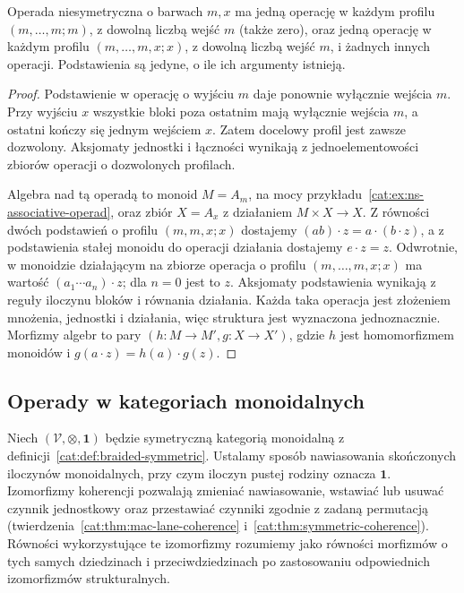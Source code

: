 \begin{przyklad}\label{cat:ex:colored-monoid-action}
Operada niesymetryczna o barwach $m,x$ ma jedną operację w każdym profilu $(m,\ldots,m;m)$, z dowolną liczbą wejść $m$ (także zero), oraz jedną operację w każdym profilu $(m,\ldots,m,x;x)$, z dowolną liczbą wejść $m$, i żadnych innych operacji. Podstawienia są jedyne, o ile ich argumenty istnieją.
\end{przyklad}
\begin{proof}
Podstawienie w operację o wyjściu $m$ daje ponownie wyłącznie wejścia $m$. Przy wyjściu $x$ wszystkie bloki poza ostatnim mają wyłącznie wejścia $m$, a ostatni kończy się jednym wejściem $x$. Zatem docelowy profil jest zawsze dozwolony. Aksjomaty jednostki i łączności wynikają z jednoelementowości zbiorów operacji o dozwolonych profilach.

Algebra nad tą operadą to monoid $M=A_m$, na mocy przykładu~\ref{cat:ex:ns-associative-operad}, oraz zbiór $X=A_x$ z działaniem $M\times X\to X$. Z równości dwóch podstawień o profilu $(m,m,x;x)$ dostajemy $(ab)\cdot z=a\cdot(b\cdot z)$, a z podstawienia stałej monoidu do operacji działania dostajemy $e\cdot z=z$. Odwrotnie, w monoidzie działającym na zbiorze operacja o profilu $(m,\ldots,m,x;x)$ ma wartość $(a_1\cdots a_n)\cdot z$; dla $n=0$ jest to $z$. Aksjomaty podstawienia wynikają z reguły iloczynu bloków i równania działania. Każda taka operacja jest złożeniem mnożenia, jednostki i działania, więc struktura jest wyznaczona jednoznacznie. Morfizmy algebr to pary $(h:M\to M',g:X\to X')$, gdzie $h$ jest homomorfizmem monoidów i $g(a\cdot z)=h(a)\cdot g(z)$.
\end{proof}

\subsection{Operady w kategoriach monoidalnych}

Niech $(\mathcal V,\otimes,\mathbf 1)$ będzie symetryczną kategorią monoidalną z definicji~\ref{cat:def:braided-symmetric}. Ustalamy sposób nawiasowania skończonych iloczynów monoidalnych, przy czym iloczyn pustej rodziny oznacza $\mathbf 1$. Izomorfizmy koherencji pozwalają zmieniać nawiasowanie, wstawiać lub usuwać czynnik jednostkowy oraz przestawiać czynniki zgodnie z zadaną permutacją (twierdzenia~\ref{cat:thm:mac-lane-coherence} i~\ref{cat:thm:symmetric-coherence}). Równości wykorzystujące te izomorfizmy rozumiemy jako równości morfizmów o tych samych dziedzinach i przeciwdziedzinach po zastosowaniu odpowiednich izomorfizmów strukturalnych.

